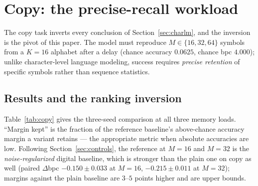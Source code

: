 
\section{Copy: the precise-recall workload}
\label{sec:copy}

The copy task inverts every conclusion of Section~\ref{sec:charlm}, and the inversion is the
pivot of this paper. The model must reproduce $M \in \{16, 32, 64\}$ symbols from a $K{=}16$
alphabet after a delay (chance accuracy $0.0625$, chance bpc $4.000$); unlike character-level
language modeling, success requires \emph{precise retention} of specific symbols rather than
sequence statistics.

\subsection{Results and the ranking inversion}
\label{sec:copy-results}

Table~\ref{tab:copy} gives the three-seed comparison at all three memory loads. ``Margin
kept'' is the fraction of the reference baseline's above-chance accuracy margin a variant
retains --- the appropriate metric when absolute accuracies are low. Following
Section~\ref{sec:controls}, the reference at $M{=}16$ and $M{=}32$ is the
\emph{noise-regularized} digital baseline, which is stronger than the plain one on copy as
well (paired $\Delta$bpc $-0.150 \pm 0.033$ at $M{=}16$, $-0.215 \pm 0.011$ at $M{=}32$);
margins against the plain baseline are $3$--$5$ points higher and are upper bounds.

